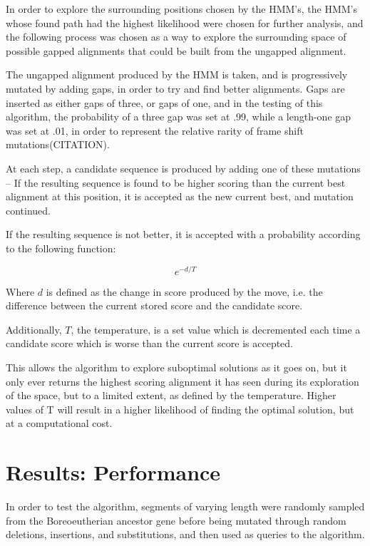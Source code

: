 \documentclass[12pt, conference]{IEEEtran}
\begin{document}
	In order to explore the surrounding positions chosen by the HMM's, the HMM's whose found path had the highest likelihood were chosen for further analysis, and the following process was chosen as a way to explore the surrounding space of possible gapped alignments that could be built from the ungapped alignment.
	
	The ungapped alignment produced by the HMM is taken, and is progressively mutated by adding gaps, in order to try and find better alignments. Gaps are inserted as either gaps of three, or gaps of one, and in the testing of this algorithm, the probability of a three gap was set at .99, while a length-one gap was set at .01, in order to represent the relative rarity of frame shift mutations(CITATION).
	
	At each step, a candidate sequence is produced by adding one of these mutations -- If the resulting sequence is found to be higher scoring than the current best alignment at this position, it is accepted as the new current best, and mutation continued.
	
	If the resulting sequence is not better, it is accepted with a probability according to the following function:
	
	\begin{equation}
		e^{-d/T}
	\label{PAF}
	\end{equation}
	
	Where $d$ is defined as the change in score produced by the move, i.e. the difference between the current stored score and the candidate score.
	
	Additionally, $T$, the temperature, is a set value which is decremented each time a candidate score which is worse than the current score is accepted.
	
	This allows the algorithm to explore suboptimal solutions as it goes on, but it only ever returns the highest scoring alignment it has seen during its exploration of the space, but to a limited extent, as defined by the temperature. Higher values of T will result in a higher likelihood of finding the optimal solution, but at a computational cost.

\section{\textbf{Results: Performance}}

In order to test the algorithm, segments of varying length were randomly sampled from the Boreoeutherian ancestor gene before being mutated through random deletions, insertions, and substitutions, and then used as queries to the algorithm.
\end{document}
